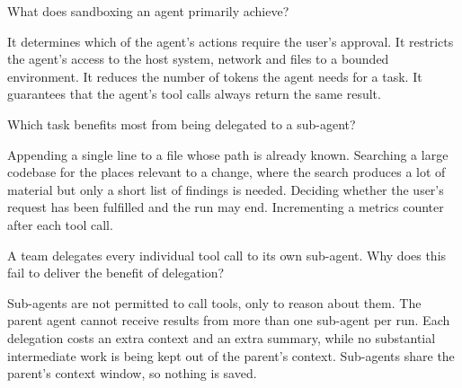 \qitem What does sandboxing an agent primarily achieve?
\begin{choices}
  \choice It determines which of the agent's actions require the user's approval.
  \CorrectChoice It restricts the agent's access to the host system, network and files to a bounded environment.
  \choice It reduces the number of tokens the agent needs for a task.
  \choice It guarantees that the agent's tool calls always return the same result.
\end{choices}
\dontknow
{}



\qitem Which task benefits most from being delegated to a sub-agent?
\begin{choices}
  \choice Appending a single line to a file whose path is already known.
  \CorrectChoice Searching a large codebase for the places relevant to a change, where the search produces a lot of material but only a short list of findings is needed.
  \choice Deciding whether the user's request has been fulfilled and the run may end.
  \choice Incrementing a metrics counter after each tool call.
\end{choices}
\dontknow
{}

\qitem A team delegates every individual tool call to its own sub-agent. Why does this fail to deliver
the benefit of delegation?
\begin{choices}
  \choice Sub-agents are not permitted to call tools, only to reason about them.
  \choice The parent agent cannot receive results from more than one sub-agent per run.
  \CorrectChoice Each delegation costs an extra context and an extra summary, while no substantial intermediate work is being kept out of the parent's context.
  \choice Sub-agents share the parent's context window, so nothing is saved.
\end{choices}
\dontknow
{}


